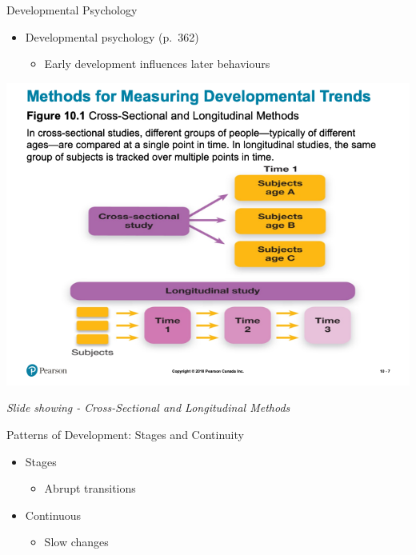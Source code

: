 \documentclass[
]{book}
\providecommand{\tightlist}{%
  \setlength{\itemsep}{0pt}\setlength{\parskip}{0pt}}
\begin{document}
\begin{reflect}
Developmental Psychology

\begin{itemize}
\tightlist
\item
  Developmental psychology (p.~362)

  \begin{itemize}
  \tightlist
  \item
    Early development influences later behaviours
  \end{itemize}
\end{itemize}

\includegraphics{assets/unit_3/slide_7.png}

\emph{Slide showing - Cross-Sectional and Longitudinal Methods}

Patterns of Development: Stages and Continuity

\begin{itemize}
\tightlist
\item
  Stages

  \begin{itemize}
  \tightlist
  \item
    Abrupt transitions\\
  \end{itemize}
\item
  Continuous

  \begin{itemize}
  \tightlist
  \item
    Slow changes
  \end{itemize}
\end{itemize}


\end{reflect}
\end{document}
